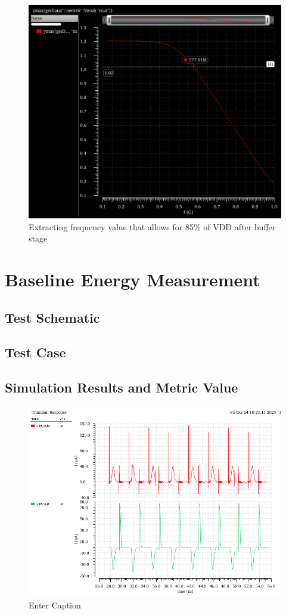 \documentclass[12pt]{article}
\begin{document}
\begin{figure}[H]
    \centering
    \includegraphics[width=0.75\linewidth]{writeup//figures/max_frequencies.png}
    \caption{Extracting frequency value that allows for 85\% of VDD after buffer stage}
\end{figure}

\newpage

\section{Baseline Energy Measurement}
\subsection{Test Schematic}



\newpage

\subsection{Test Case}



\newpage

\subsection{Simulation Results and Metric Value}
\begin{figure}[H]
    \centering
    \includegraphics[width=0.5\linewidth]{writeup//figures/baseline_energy_currents.png}
    \caption{Enter Caption}
\end{figure}
\end{document}
